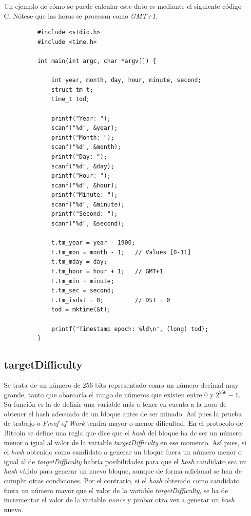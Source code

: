 \documentclass{article}
\begin{document}
    Un ejemplo de cómo se puede calcular este dato es mediante el siguiente código C. Nótese que las horas se procesan como \textit{GMT+1}.
    \begin{figure}[H]
    \centering
        \begin{verbatim}
    #include <stdio.h>
    #include <time.h>
    
    int main(int argc, char *argv[]) {
    
    	int year, month, day, hour, minute, second;
    	struct tm t;
    	time_t tod;
    
    	printf("Year: ");
    	scanf("%d", &year);
    	printf("Month: ");
    	scanf("%d", &month);
    	printf("Day: ");
    	scanf("%d", &day);
    	printf("Hour: ");
    	scanf("%d", &hour);
    	printf("Minute: ");
    	scanf("%d", &minute);
    	printf("Second: ");
    	scanf("%d", &second);
    
    	t.tm_year = year - 1900;
    	t.tm_mon = month - 1;   // Values [0-11]
    	t.tm_mday = day;
    	t.tm_hour = hour + 1;   // GMT+1
    	t.tm_min = minute;
    	t.tm_sec = second;
    	t.tm_isdst = 0;         // DST = 0
    	tod = mktime(&t);
    
    	printf("Timestamp epoch: %ld\n", (long) tod);
    }
        \end{verbatim}
    \end{figure}

    \subsection{targetDifficulty}
    Se trata de un número de 256 bits representado como un número decimal muy grande, tanto que abarcaría el rango de números que existen entre $0$ y $2^{256}-1$. Su función es la de definir una variable más a tener en cuenta a la hora de obtener el hash adecuado de un bloque antes de ser minado. Así pues la prueba de trabajo o \textit{Proof of Work} tendrá mayor o menor dificultad. En el protocolo de Bitcoin se define una regla que dice que el \textit{hash} del bloque ha de ser un número menor o igual al valor de la variable \textit{targetDifficulty} en ese momento. Así pues, si el \textit{hash} obtenido como candidato a generar un bloque fuera un número menor o igual al de \textit{targetDifficulty} habría posibilidades para que el \textit{hash} candidato sea un \textit{hash} válido para generar un nuevo bloque, aunque de forma adicional se han de cumplir otras condiciones. Por el contrario, si el \textit{hash} obtenido como candidato fuera un número mayor que el valor de la variable \textit{targetDifficulty}, se ha de incrementar el valor de la variable \textit{nonce} y probar otra vez a generar un \textit{hash} nuevo.
    
\end{document}
